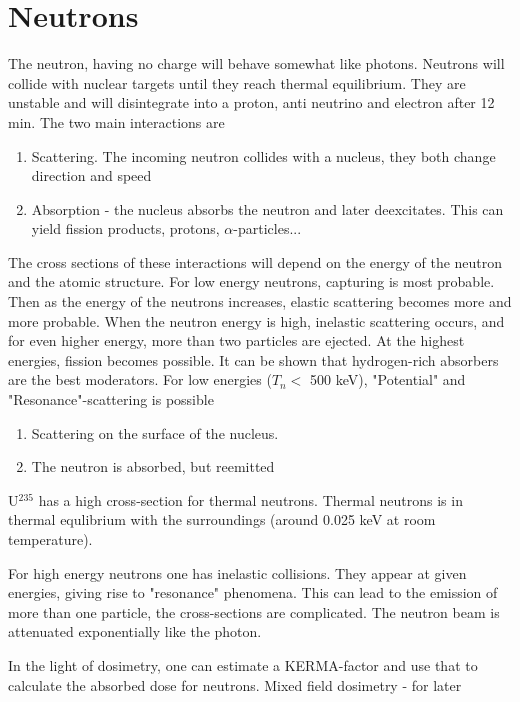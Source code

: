\section{Neutrons}

The neutron, having no charge will behave somewhat like photons.
Neutrons will collide with nuclear targets until they reach thermal equilibrium. 
They are unstable and will disintegrate into a proton, anti neutrino and electron after 12 min.
The two main interactions are

\begin{enumerate}
    \item 
    Scattering. 
    The incoming neutron collides with a nucleus, they both change direction and speed
    \item
    Absorption - the nucleus absorbs the neutron and later deexcitates. This can yield fission products, protons, $\alpha$-particles...
\end{enumerate}

The cross sections of these interactions will depend on the energy of the neutron and the atomic structure.
For low energy neutrons, capturing is most probable. 
Then as the energy of the neutrons increases, elastic scattering becomes more and more probable.
When the neutron energy is high, inelastic scattering occurs, and for even higher energy, more than two particles are ejected. 
At the highest energies, fission becomes possible. 
It can be shown that hydrogen-rich absorbers are the best moderators.
For low energies ($T_n < $ 500 keV), "Potential" and "Resonance"-scattering is possible

\begin{enumerate}
    \item 
    Scattering on the surface of the nucleus.
    \item
    The neutron is absorbed, but reemitted
\end{enumerate}

U$^{235}$ has a high cross-section for thermal neutrons. 
Thermal neutrons is in thermal equlibrium with the surroundings (around 0.025 keV at room temperature).

For high energy neutrons one has inelastic collisions. 
They appear at given energies, giving rise to "resonance" phenomena.
This can lead to the emission of more than one particle, the cross-sections are complicated.
The neutron beam is attenuated exponentially like the photon.

In the light of dosimetry, one can estimate a KERMA-factor and use that to calculate the absorbed dose for neutrons.
Mixed field dosimetry - for later
